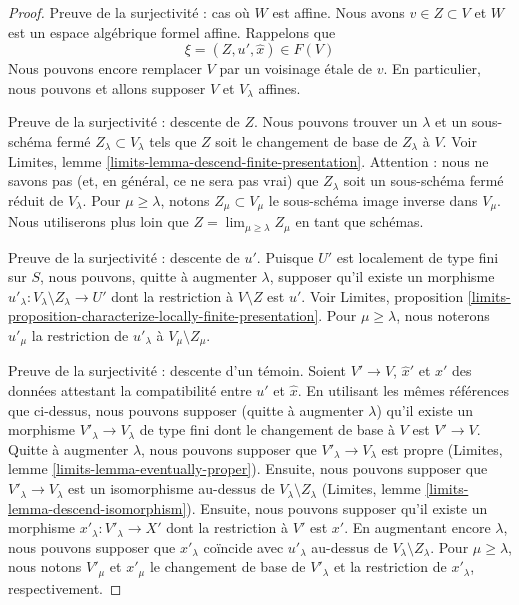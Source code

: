 \begin{proof}
\medskip\noindent
Preuve de la surjectivité : cas où $W$ est affine. Nous avons $v \in Z \subset V$
et $W$ est un espace algébrique formel affine. Rappelons que
$$
\xi = (Z, u', \hat x) \in F(V)
$$
Nous pouvons encore remplacer $V$ par un voisinage \'etale de $v$.
En particulier, nous pouvons et allons supposer $V$ et $V_\lambda$ affines.

\medskip\noindent
Preuve de la surjectivité : descente de $Z$. Nous pouvons trouver un $\lambda$
et un sous-schéma fermé $Z_\lambda \subset V_\lambda$ tels que
$Z$ soit le changement de base de $Z_\lambda$ à $V$. Voir
Limites, lemme \ref{limits-lemma-descend-finite-presentation}.
Attention : nous ne savons pas (et, en général, ce ne sera pas vrai)
que $Z_\lambda$ soit un sous-schéma fermé réduit de $V_\lambda$.
Pour $\mu \geq \lambda$, notons $Z_\mu \subset V_\mu$ le sous-schéma
image inverse dans $V_\mu$. Nous utiliserons plus loin que
$Z = \lim_{\mu \geq \lambda} Z_\mu$ en tant que schémas.

\medskip\noindent
Preuve de la surjectivité : descente de $u'$.
Puisque $U'$ est localement de type fini sur $S$,
nous pouvons, quitte à augmenter $\lambda$, supposer
qu'il existe un morphisme
$u'_\lambda : V_\lambda \setminus Z_\lambda \to U'$
dont la restriction à $V \setminus Z$ est $u'$.
Voir Limites, proposition
\ref{limits-proposition-characterize-locally-finite-presentation}.
Pour $\mu \geq \lambda$, nous noterons $u'_\mu$ la restriction
de $u'_\lambda$ à $V_\mu \setminus Z_\mu$.

\medskip\noindent
Preuve de la surjectivité : descente d'un témoin.
Soient $V' \to V$, $\hat x'$ et $x'$ des données attestant la compatibilité entre
$u'$ et $\hat x$. En utilisant les mêmes références que ci-dessus, nous pouvons
supposer (quitte à augmenter $\lambda$) qu'il existe un morphisme
$V'_\lambda \to V_\lambda$ de type fini dont le changement de base à $V$
est $V' \to V$. Quitte à augmenter $\lambda$, nous pouvons supposer que
$V'_\lambda \to V_\lambda$ est propre
(Limites, lemme \ref{limits-lemma-eventually-proper}).
Ensuite, nous pouvons supposer que $V'_\lambda \to V_\lambda$ est un isomorphisme
au-dessus de $V_\lambda \setminus Z_\lambda$
(Limites, lemme \ref{limits-lemma-descend-isomorphism}).
Ensuite, nous pouvons supposer qu'il existe un morphisme
$x'_\lambda : V'_\lambda \to X'$ dont la restriction à $V'$ est $x'$.
En augmentant encore $\lambda$, nous pouvons supposer que $x'_\lambda$
coïncide avec $u'_\lambda$ au-dessus de $V_\lambda \setminus Z_\lambda$.
Pour $\mu \geq \lambda$, nous notons $V'_\mu$ et $x'_\mu$ le changement de
base de $V'_\lambda$ et la restriction de $x'_\lambda$, respectivement.


\end{proof}
